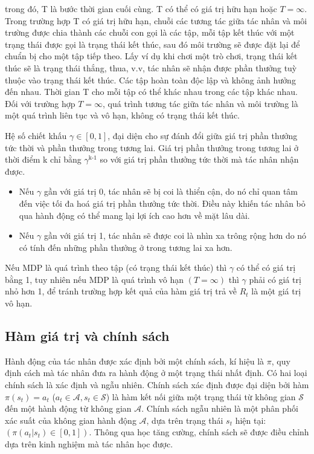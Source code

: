 \documentclass{uetgraduation}
\begin{document}
trong đó, T là bước thời gian cuối cùng. T có thể có giá trị hữu hạn hoặc $T = \infty$. Trong trường hợp T có giá trị hữu hạn, chuỗi các tương tác giữa tác nhân và môi trường được chia thành các chuỗi
con gọi là các tập, mỗi tập kết thúc với một trạng thái được gọi là trạng thái kết thúc, sau đó môi trường sẽ được đặt lại để chuẩn bị cho một tập tiếp theo. Lấy ví dụ khi chơi một trò chơi, trạng thái
kết thúc sẽ là trạng thái thắng, thua, v.v, tác nhân sẽ nhận được phần thưởng tuỳ thuộc vào trạng thái kết thúc. Các tập hoàn toàn độc lập và không ảnh hưởng đến nhau. Thời gian T cho mỗi tập có thể khác
nhau trong các tập khác nhau. Đối với trường hợp $T = \infty$, quá trình tương tác giữa tác nhân và môi trường là một quá trình liên tục và vô hạn, không có trạng thái kết thúc.

Hệ số chiết khấu $\gamma \in [0, 1]$, đại diện cho sự đánh đổi giữa giá trị phần thưởng tức thời và phần thưởng trong tương lai. Giá trị phần thưởng trong tương lai ở thời điểm k chỉ bằng $\gamma^\text{k-1}$
so với giá trị phần thưởng tức thời mà tác nhân nhận được.
\begin{itemize}
    \item Nếu $\gamma$ gần với giá trị 0, tác nhân sẽ bị coi là thiển cận, do nó chỉ quan tâm đến việc tối đa hoá giá trị phần thưởng tức thời. Điều này khiến tác nhân bỏ qua hành động có thể mang lại lợi ích 
    cao hơn về mặt lâu dài.
    \item Nếu $\gamma$ gần với giá trị 1, tác nhân sẽ được coi là nhìn xa trông rộng hơn do nó có tính đến những phần thưởng ở trong tương lai xa hơn.
\end{itemize}

Nếu MDP là quá trình theo tập (có trạng thái kết thúc) thì $\gamma$ có thể có giá trị bằng 1, tuy nhiên nếu MDP là quá trình vô hạn $(T = \infty)$ thì $\gamma$ phải có giá trị nhỏ hơn 1, để tránh trường
hợp kết quả của hàm giá trị trả về $R_t$ là một giá trị vô hạn.

\subsection{Hàm giá trị và chính sách}
Hành động của tác nhân được xác định bởi một chính sách, kí hiệu là $\pi$, quy định cách mà tác nhân đưa ra hành động ở một trạng thái nhất định. Có hai loại chính sách là xác định và ngẫu nhiên. Chính sách xác định được
đại diện bởi hàm $\pi(s_t) = a_t$ ($a_t \in \mathcal{A}, s_t \in \mathcal{S}$) là hàm kết nối giữa một trạng thái từ không gian $\mathcal{S}$ đến một hành động từ không gian $\mathcal{A}$. Chính sách
ngẫu nhiên là một phân phối xác suất của không gian hành động $\mathcal{A}$, dựa trên trạng thái $s_t$ hiện tại: $(\pi(a_t | s_t) \in [0, 1])$. Thông qua học tăng cường, chính sách sẽ được điều chỉnh
dựa trên kinh nghiệm mà tác nhân học được.
\end{document}
